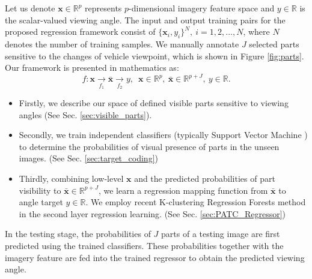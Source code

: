 \documentclass{tutmscthesis}[2010/09/22]
\numberwithin{equation}{section}
\numberwithin{table}{section}
\numberwithin{figure}{section}
\renewcommand{\vec}[1]{\bm{#1}}
\def\onedot{. }
\def\eg{\emph{e.g}\onedot} \def\Eg{\emph{E.g}\onedot}
\begin{document}
Let us denote $\vec{x} \in \mathbb{R}^{p}$ represents $p$-dimensional imagery feature space and ${y} \in \mathbb{R}$ is the scalar-valued viewing angle.
The input and output training pairs for the proposed regression framework consist of  $\{\vec{x}_{i}, y_{i}\}^N,~i=1, 2, \ldots,N$, where $N$ denotes the number of training samples.
We manually annotate $J$ selected parts sensitive to the changes of vehicle viewpoint, which is shown in Figure \ref{fig:parts}.
Our framework is presented in mathematics as: 
\begin{displaymath}
f: \vec{x} \underset{f_1}{\rightarrow} \bar{\vec{x}} \underset{f_2}{\rightarrow} y, \enspace \vec{x} \in \mathbb{R}^p,~\bar{\vec{x}} \in \mathbb{R}^{p+J},~y \in \mathbb{R}. 
\end{displaymath} 
\begin{itemize}
\item Firstly, we describe our space of defined visible parts sensitive to viewing angles (See Sec. \ref{sec:visible_parts}).
\item Secondly, we train independent classifiers (typically Support Vector Machine \cite{cortes1995support}) to determine the probabilities of visual presence of parts in the unseen images. (See Sec. \ref{sec:target_coding}) 
\item Thirdly, combining low-level $\vec{x}$ and the predicted 
probabilities of part visibility to $\bar{\vec{x}} \in \mathbb{R}^{p+J}$, we learn a regression mapping function from $\bar{\vec{x}}$ to angle target ${y} \in \mathbb{R}$. We employ recent K-clustering Regression Forests method in the second layer regression learning. (See Sec. \ref{sec:PATC_Regressor})
\end{itemize}
In the testing stage, the probabilities of $J$ parts of a testing image are first predicted using the trained classifiers. These probabilities together with the imagery feature are fed into the trained regressor to obtain the predicted viewing angle. 
\end{document}
